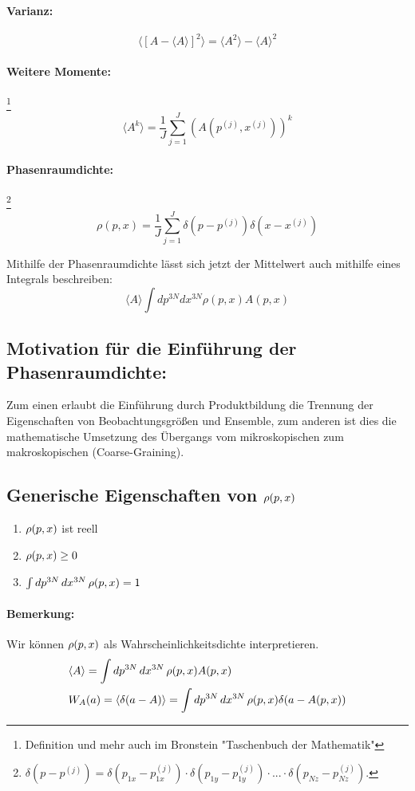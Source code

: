 	\paragraph{Varianz:}
	\[\langle [A - \langle A \rangle]^2 \rangle  = \langle A^2 \rangle - \langle A \rangle^2 \]
	\paragraph{Weitere Momente:}\footnote{Definition und mehr auch im Bronstein "Taschenbuch der Mathematik"}
	\[ \langle A^k \rangle = \frac{1}{J} \sum_{j=1}^{J}(A(p^{(j)},x^{(j)}))^k \]
	\paragraph{Phasenraumdichte:}\footnote{$ \delta(p-p^{(j)}) = \delta(p_{1x}-p_{1x}^{(j)}) \cdot \delta(p_{1y}-p_{1y}^{(j)})\cdot ... \cdot \delta(p_{Nz}-p_{Nz}^{(j)})$.}
	\[ \rho (p,x) = \frac{1}{J} \sum_{j=1}^{J} \delta(p-p^{(j)}) \delta(x-x^{(j)}) \]
	
	\noindent Mithilfe der Phasenraumdichte lässt sich jetzt der Mittelwert auch mithilfe eines Integrals beschreiben: 
	\[ \langle A \rangle \int dp^{3N} dx^{3N} \rho (p,x) A(p,x)\]
	
	\subsection{Motivation für die Einführung der Phasenraumdichte:}
	Zum einen erlaubt die Einführung durch Produktbildung die Trennung der Eigenschaften von Beobachtungsgrößen und Ensemble, zum anderen ist dies die mathematische Umsetzung des Übergangs vom mikroskopischen zum makroskopischen (Coarse-Graining). 
	
	\subsection{Generische Eigenschaften von $\rho ( p , x )$}

\begin{enumerate}
	\item $\rho ( p , x )$ ist reell\\
	\item $\rho ( p , x ) \geq 0$\\
	\item $\int dp^{3N} \, dx^{3N} \, \rho ( p , x ) = 1$
\end{enumerate}
\paragraph{Bemerkung:} Wir können $\rho ( p , x )$ als Wahrscheinlichkeitsdichte
interpretieren.
\begin{align*}
	&\langle A \rangle = \int dp^{3N} \, dx^{3N} \, \rho ( p , x ) A(p,x)\\
	&W_{A}(a) = \langle \delta ( a - A ) \rangle = \int dp^{3N} \, dx^{3N} \, \rho ( p , x ) \delta ( a - A(p,x) )
\end{align*}

